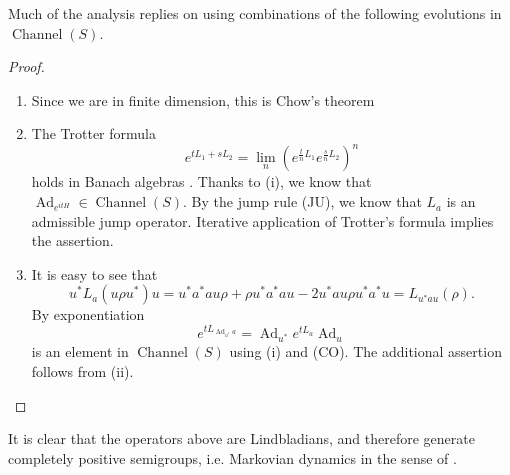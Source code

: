 \documentclass[11pt,reqno]{amsart}
\theoremstyle{definition}
\newtheorem{proposition}[theorem]{Proposition}
\newcommand{\mf}{\mathfrak}
\DeclareMathOperator{\spn}{span}
\DeclareMathOperator{\ad}{ad}
\DeclareMathOperator{\Ad}{Ad}
\DeclareMathOperator{\chan}{Channel}
\begin{document}
Much of the analysis replies on using combinations of the following evolutions in $\chan(S)$.
\begin{proof}
    \begin{enumerate}
        \item Since we are in finite dimension, this is Chow's theorem \cite{chow}  
        \item The Trotter formula 
            $$e^{tL_1+sL_2} = \lim_n (e^{\frac{t}{n}L_1}e^{\frac{s}{n}L_2})^n$$
            holds in Banach algebras \cite{hall2013quantum}. Thanks to (i), we know that $\Ad_{e^{itH}}\in \chan(S)$. By the jump rule (JU), we know that $L_a$ is an admissible jump operator. Iterative application of Trotter's formula implies the assertion. 
        \item It is easy to see that 
            \[ u^*L_a(u\rho u^*)u
            = u^*a^*au\rho + \rho u^*a^*au-2u^*au\rho u^*a^*u 
            = L_{u^*au}(\rho)  . \] 
            By exponentiation 
            \[ e^{tL_{\Ad_{u^*}a}} = \Ad_{u^*}e^{tL_a}\Ad_{u} \] 
            is an element in $\chan(S)$ using (i) and (CO). The additional assertion follows from (ii).
    \end{enumerate}
\end{proof}
It is clear that the operators above are Lindbladians, and therefore generate completely positive semigroups, i.e. Markovian dynamics in the sense of \cite{wolf_cirac}.
\end{document}
